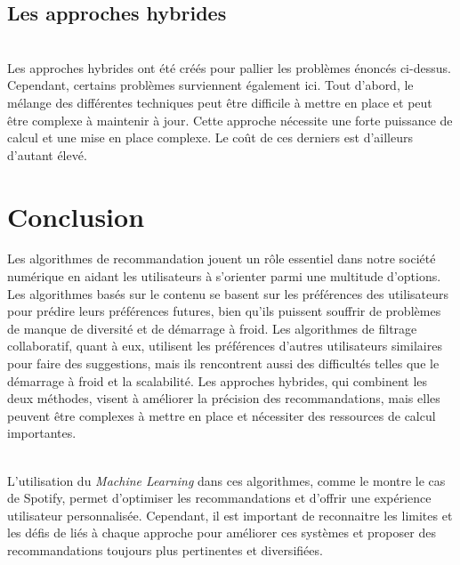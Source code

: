 \documentclass[12pt,a4paper]{article}
\begin{document}
\subsection{Les approches hybrides}
~\\
 Les approches hybrides ont été créés pour pallier les problèmes énoncés ci-dessus. Cependant, certains problèmes surviennent également ici. Tout d'abord, le mélange des différentes techniques peut être difficile à mettre en place et peut être complexe à maintenir à jour. Cette approche nécessite une forte puissance de calcul et une mise en place complexe. Le coût de ces derniers est d'ailleurs d'autant élevé.
\section{Conclusion}
Les algorithmes de recommandation jouent un rôle essentiel dans notre société numérique en aidant les utilisateurs à s'orienter parmi une multitude d'options. Les algorithmes basés sur le contenu se basent sur les préférences des utilisateurs pour prédire leurs préférences futures, bien qu'ils puissent souffrir de problèmes de manque de diversité et de démarrage à froid. Les algorithmes de filtrage collaboratif, quant à eux, utilisent les préférences d'autres utilisateurs similaires pour faire des suggestions, mais ils rencontrent aussi des difficultés telles que le démarrage à froid et la scalabilité. Les approches hybrides, qui combinent les deux méthodes, visent à améliorer la précision des recommandations, mais elles peuvent être complexes à mettre en place et nécessiter des ressources de calcul importantes.

~\\
 L'utilisation du \textit{Machine Learning} dans ces algorithmes, comme le montre le cas de Spotify, permet d'optimiser les recommandations et d'offrir une expérience utilisateur personnalisée. Cependant, il est important de reconnaitre les limites et les défis de liés à chaque approche pour améliorer ces systèmes et proposer des recommandations toujours plus pertinentes et diversifiées. 
\newpage
\printbibliography
\end{document}
